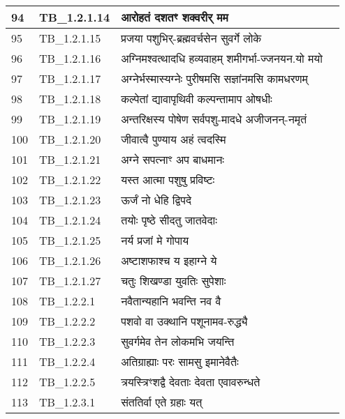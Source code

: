 \documentclass[17pt]{extarticle}
\begin{document}
\begin{longtable}{||p{0.4in}||p{0.9in}||p{4.0in}||p{0.9in}||}
            94 & TB\_1.2.1.14 & आरोहतं दशतꣳ शक्वरीर् मम &      \\
        \hline
            95 & TB\_1.2.1.15 & प्रजया पशुभिर्{-}ब्रह्मवर्चसेन सुवर्गे लोके &      \\
        \hline
            96 & TB\_1.2.1.16 & अग्निमश्वत्थादधि हव्यवाहम् शमीगर्भा{-}ज्जनयन.यो मयो &      \\
        \hline
            97 & TB\_1.2.1.17 & अग्नेर्भस्मास्यग्नेः पुरीषमसि सज्ञांनमसि कामधरणम् &      \\
        \hline
            98 & TB\_1.2.1.18 & कल्पेतां द्यावापृथिवी कल्पन्तामाप ओषधीः &      \\
        \hline
            99 & TB\_1.2.1.19 & अन्तरिक्षस्य पोषेण सर्वपशु{-}मादधे अजीजनन्{-}नमृतं &      \\
        \hline
            100 & TB\_1.2.1.20 & जीवात्वै पुण्याय अहं त्वदस्मि &      \\
        \hline
            101 & TB\_1.2.1.21 & अग्ने सपत्नाꣳ अप बाधमानः &      \\
        \hline
            102 & TB\_1.2.1.22 & यस्त आत्मा पशुषु प्रविष्टः &      \\
        \hline
            103 & TB\_1.2.1.23 & ऊर्जं नो धेहि द्विपदे &      \\
        \hline
            104 & TB\_1.2.1.24 & तयोः पृष्ठे सीदतु जातवेदाः &      \\
        \hline
            105 & TB\_1.2.1.25 & नर्य प्रजां मे गोपाय &      \\
        \hline
            106 & TB\_1.2.1.26 & अष्टाशफाश्च य इहाग्ने ये &      \\
        \hline
            107 & TB\_1.2.1.27 & चतुः शिखण्डा युवतिः सुपेशाः &      \\
        \hline
            108 & TB\_1.2.2.1 & नवैतान्यहानि भवन्ति नव वै &      \\
        \hline
            109 & TB\_1.2.2.2 & पशवो वा उक्थानि पशूनामव{-}रुद्ध्यै &      \\
        \hline
            110 & TB\_1.2.2.3 & सुवर्गमेव तेन लोकमभि जयन्ति &      \\
        \hline
            111 & TB\_1.2.2.4 & अतिग्राह्याः परः सामसु इमानेवैतैः &      \\
        \hline
            112 & TB\_1.2.2.5 & त्रयस्त्रिꣳशद्वै देवताः देवता एवावरुन्धते &      \\
        \hline
            113 & TB\_1.2.3.1 & संततिर्वा एते ग्रहाः यत् &      \\
        \hline

\end{longtable}
\end{document}
